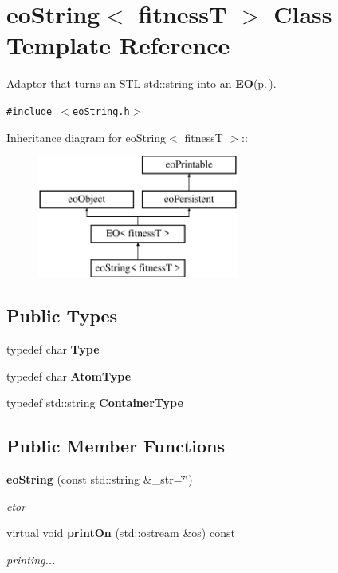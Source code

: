 \section{eo\-String$<$ fitness\-T $>$ Class Template Reference}
\label{classeo_string}
Adaptor that turns an STL std::string into an {\bf EO}{\rm (p.\,\pageref{class_e_o})}.  


{\tt \#include $<$eo\-String.h$>$}

Inheritance diagram for eo\-String$<$ fitness\-T $>$::\begin{figure}[H]
\begin{center}
\leavevmode
\includegraphics[height=4cm]{classeo_string}
\end{center}
\end{figure}
\subsection*{Public Types}
\begin{CompactItemize}
\item 
typedef char {\bf Type}\label{classeo_string_w0}

\item 
typedef char {\bf Atom\-Type}\label{classeo_string_w1}

\item 
typedef std::string {\bf Container\-Type}\label{classeo_string_w2}

\end{CompactItemize}
\subsection*{Public Member Functions}
{\bf }\par
\begin{CompactItemize}
\item 
{\bf eo\-String} (const std::string \&\_\-str=\char`\"{}\char`\"{})\label{classeo_string_z24_0}

\begin{CompactList}\small\item\em ctor \item\end{CompactList}\item 
virtual void {\bf print\-On} (std::ostream \&os) const \label{classeo_string_z24_1}

\begin{CompactList}\small\item\em printing... \item\end{CompactList}\end{CompactItemize}

